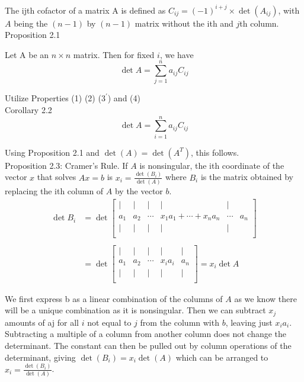 \documentclass[12pt]{article}
\begin{document}
The ijth cofactor of a matrix A is defined as $C_{ij} = (-1)^{i+j} \times \det(A_{ij})$, with $A$ being the $(n-1)$ by $(n-1)$ matrix without the ith and $j$th column.\\

Proposition 2.1

Let A be an $n \times n$ matrix. Then for fixed $i$, we have
\begin{equation*}
\det A = \sum_{j=1}^n a_{ij} C_{ij}
\end{equation*}

Utilize Properties (1) (2) ($3^\prime$) and (4)\\

Corollary 2.2
\begin{equation*}
\det A = \sum_{i=1}^n a_{ij} C_{ij}
\end{equation*}

Using Proposition 2.1 and $\det(A) = \det(A^T)$, this follows.\\

Proposition 2.3: Cramer's Rule. If $A$ is nonsingular, the ith coordinate of the vector $x$ that solves $Ax = b$ is $x_i = \frac{\det(B_i)}{\det(A)}$ where $B_i$ is the matrix obtained by replacing the ith column of $A$ by the vector $b$.\\

\begin{align*}
\det B_i & = \det \begin{bmatrix}
| & | & | & | & |\\
a_1 & a_2 & \cdots & x_1 a_1 + \cdots + x_n a_n & \cdots & a_n\\
| & | & | & | & |\\
\end{bmatrix}\\
& \\
& = \det \begin{bmatrix}
| & | & | & | & |\\
a_1& a_2 & \cdots & x_i a_i & a_n\\
| & | & | & | & |\\
\end{bmatrix} = x_i \det A
\end{align*}

We first express b as a linear combination of the columns of $A$ as we know there will be a unique combination as it is nonsingular. Then we can subtract $x_j$ amounts of aj for all $i$ not equal to $j$ from the column with $b$, leaving just $x_i a_i$. Subtracting a multiple of a column from another column does not change the determinant. The constant can then be pulled out by column operations of the determinant, giving $\det(B_i) = x_i  \det(A)$ which can be arranged to $x_i = \frac{\det(B_i)}{\det(A)}$.\\
\end{document}
